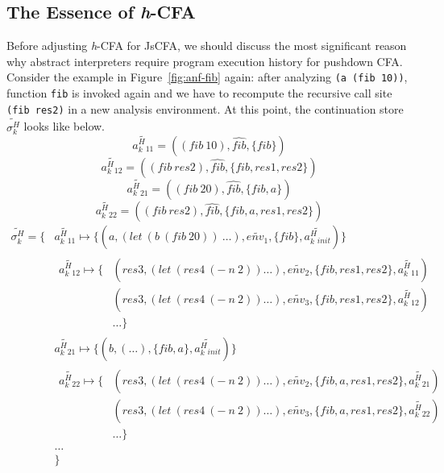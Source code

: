 \documentclass[12pt]{report}
\begin{document}
\subsection{The Essence of \textit{h}-CFA}
\label{subs:ehcfa}
Before adjusting \textit{h}-CFA for JsCFA, we should discuss the most significant reason why abstract interpreters require program execution history for pushdown CFA\@. Consider the example in Figure~\ref{fig:anf-fib} again: after analyzing \verb|(a (fib 10))|, function \verb|fib| is invoked again and we have to recompute the recursive call site \verb|(fib res2)| in a new analysis environment. At this point, the continuation store $\widetilde{\sigma_k^H}$ looks like below.
\[
\widetilde{a^H_k{}_{11}} = ((fib\ 10), \widehat{fib}, \{fib\})
\]
\[
\widetilde{a^H_k{}_{12}} = ((fib\ res2), \widehat{fib}, \{fib, res1, res2\})
\]
\[
\widetilde{a^H_k{}_{21}} = ((fib\ 20), \widehat{fib}, \{fib, a\})
\]
\[
\widetilde{a^H_k{}_{22}} = ((fib\ res2), \widehat{fib}, \{fib, a, res1, res2\})
\]
\[
\begin{aligned}
\widetilde{\sigma_k^H} = \{ {}& \widetilde{a^H_k{}_{11}} \mapsto \{(a, (let\ (b\ (fib\ 20))\ \dots), \widetilde{env_1}, \{fib\}, \widetilde{a^H_k{}_{init}})\}  {} \\
                            &
                            \begin{aligned}
                              \widetilde{a^H_k{}_{12}} \mapsto
                              \{{}& (res3, (let\ (res4\ (-\ n\ 2)) \dots), \widetilde{env_2}, \{fib, res1, res2\}, \widetilde{a^H_k{}_{11}}) {}\\
                              & (res3, (let\ (res4\ (-\ n\ 2)) \dots), \widetilde{env_3}, \{fib, res1, res2\}, \widetilde{a^H_k{}_{12}}) {} \\
                              & \dots
                              \}
                            \end{aligned} {} \\
                            & \widetilde{a^H_k{}_{21}} \mapsto \{(b, (\dots), \{fib, a\}, \widetilde{a^H_k{}_{init}}) \} {}\\
                            &
                            \begin{aligned}
                              \widetilde{a^H_k{}_{22}} \mapsto
                              \{{}& (res3, (let\ (res4\ (-\ n\ 2)) \dots), \widetilde{env_2}, \{fib, a, res1, res2\}, \widetilde{a^H_k{}_{21}}) {}\\
                              & (res3, (let\ (res4\ (-\ n\ 2)) \dots), \widetilde{env_3}, \{fib, a, res1, res2\}, \widetilde{a^H_k{}_{22}}) {} \\
                              & \dots
                              \}
                            \end{aligned} {}\\
                            & \dots {}\\
                            & \}
\end{aligned}
\]
\end{document}
